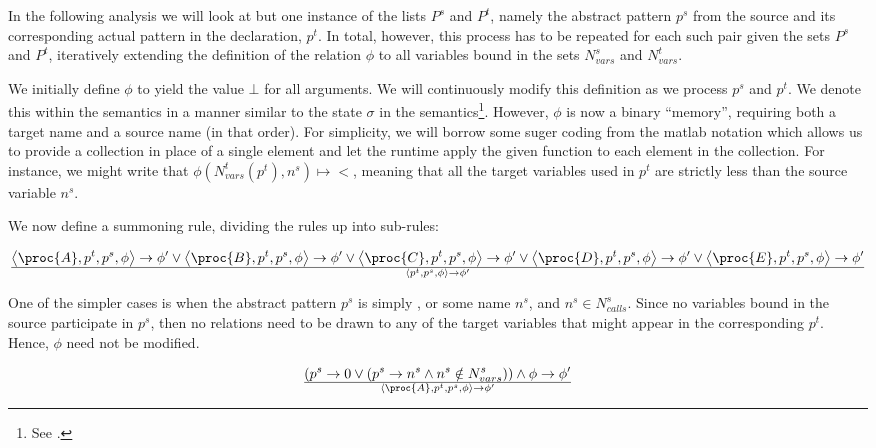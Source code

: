 In the following analysis we will look at but one instance of the lists $P^s$
and $P^t$, namely the abstract pattern $p^s$ from the source and its
corresponding actual pattern in the declaration, $p^t$. In total, however, this
process has to be repeated for each such pair given the sets $P^s$ and $P^t$,
iteratively extending the definition of the relation $\phi$ to all variables
bound in the sets $N_{vars}^s$ and $N_{vars}^t$.

We initially define $\phi$ to yield the value $\bot$ for all arguments. We will
continuously modify this definition as we process $p^s$ and $p^t$. We denote
this within the semantics in a manner similar to the state $\sigma$ in the
semantics\footnote{See .}. However, $\phi$ is now a
binary ``memory'', requiring both a target name and a source name (in that
order). For simplicity, we will borrow some suger coding from the matlab
notation which allows us to provide a collection in place of a single element
and let the runtime apply the given function to each element in the collection.
For instance, we might write that $\phi\left(N_{vars}^t(p^t), n^s\right)\mapsto
<$, meaning that all the target variables used in $p^t$ are strictly less than
the source variable $n^s$.

We now define a summoning rule, dividing the rules up into sub-rules:

\begin{equation}
{
    \left\langle\proc{A},p^t,p^s,\phi\right\rangle
    \rightarrow
    \phi'
  \vee
    \left\langle\proc{B},p^t,p^s,\phi\right\rangle
    \rightarrow
    \phi'
  \vee
    \left\langle\proc{C},p^t,p^s,\phi\right\rangle
    \rightarrow
    \phi'
  \vee
    \left\langle\proc{D},p^t,p^s,\phi\right\rangle
    \rightarrow
    \phi'
  \vee
    \left\langle\proc{E},p^t,p^s,\phi\right\rangle
    \rightarrow
    \phi'
}\over{
  \left\langle p^t,p^s,\phi\right\rangle
  \rightarrow
  \phi'
}
\end{equation}

One of the simpler cases is when the abstract pattern $p^s$ is simply ,
or some name $n^s$, and $n^s\in N_{calls}^s$. Since no variables bound in the
source participate in $p^s$, then no relations need to be drawn to any of the
target variables that might appear in the corresponding $p^t$. Hence, $\phi$
need not be modified.

\begin{equation}\label{eq:sct-pattern-source-fail}
{
\left(
    p^s\rightarrow 0
  \vee
\left(
    p^s\rightarrow n^s
  \wedge
    n^s\notin N_{vars}^s
\right)
\right)
  \wedge
    \phi\rightarrow\phi'
}\over{
  \left\langle\proc{A},p^t,p^s,\phi\right\rangle
  \rightarrow
  \phi'
}
\end{equation}

